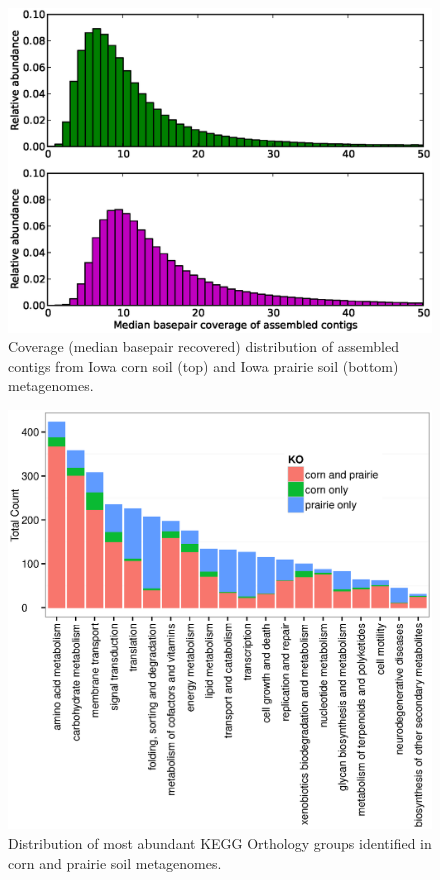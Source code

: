 \documentclass{pnastwo}
\begin{document}
\begin{figure} \begin{center}
\centerline{\includegraphics[width=.7\textwidth]{./figures/fig3-coverage.eps}}
\caption{Coverage (median basepair recovered) distribution of assembled contigs
from Iowa corn soil (top) and Iowa prairie soil (bottom) metagenomes.}
\label{soilassemblycoverage} \end{center} \end{figure}



\begin{figure}[ht] \begin{center}
\centerline{\includegraphics[width=.7\textwidth]{./figures/ko-distributions.eps}}
\caption{Distribution of most abundant KEGG Orthology groups identified in corn
and prairie soil metagenomes.} \label{kegg-dist} \end{center} \end{figure}
\end{document}
